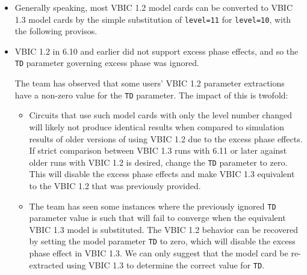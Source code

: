\begin{itemize}
  \item Generally speaking, most VBIC 1.2 model cards can be converted
    to VBIC 1.3 model cards by the simple substitution of
    \texttt{level=11} for \texttt{level=10}, with the following provisos.

  \item VBIC 1.2 in \Xyce{} 6.10 and earlier did not support excess
    phase effects, and so the \texttt{TD} parameter governing excess
    phase was ignored.

    The \Xyce{} team has observed that some users' VBIC 1.2 parameter
    extractions have a non-zero value for the \texttt{TD} parameter.
    The impact of this is twofold:
    \begin{itemize}
      \item Circuits that use such model cards with only the level
        number changed will likely not produce identical results when
        compared to simulation results of older versions of \Xyce{}
        using VBIC 1.2 due to the excess phase effects.  If strict
        comparison between VBIC 1.3 runs with \Xyce{} 6.11 or later
        against older runs with VBIC 1.2 is desired, change the
        \texttt{TD} parameter to zero.  This will disable the excess
        phase effects and make VBIC 1.3 equivalent to the VBIC 1.2
        that was previously provided.
      \item The \Xyce{} team has seen some instances where the
        previously ignored \texttt{TD} parameter value is such that
        \Xyce{} will fail to converge when the equivalent VBIC 1.3
        model is substituted.  The VBIC 1.2 behavior can be recovered
        by setting the model parameter \texttt{TD} to zero, which will
        disable the excess phase effect in VBIC 1.3.  We can only
        suggest that the model card be re-extracted using VBIC 1.3 to
        determine the correct value for \texttt{TD}.
    \end{itemize}


\end{itemize}
